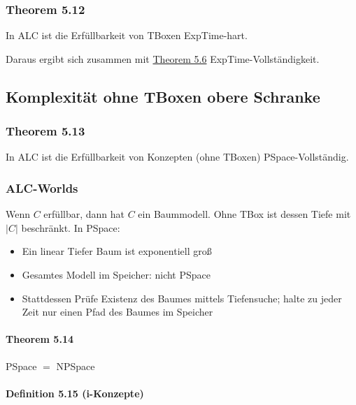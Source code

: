 \subsubsection{ Theorem 5.12}\label{theorem-5.12}

In ALC ist die Erfüllbarkeit von TBoxen ExpTime-hart.

Daraus ergibt sich zusammen mit \protect\hyperlink{theorem-5.6}{Theorem
5.6} ExpTime-Vollständigkeit.

\subsection{Komplexität ohne TBoxen obere
Schranke}\label{komplexituxe4t-ohne-tboxen-obere-schranke}

\subsubsection{Theorem 5.13}\label{theorem-5.13}

In ALC ist die Erfüllbarkeit von Konzepten (ohne TBoxen)
PSpace-Vollständig.

\subsubsection{ALC-Worlds}\label{alc-worlds}

Wenn $C$ erfüllbar, dann hat $C$ ein Baummodell. Ohne TBox ist
dessen Tiefe mit $\left| C \right|$ beschränkt. In PSpace:

\begin{itemize}
\item
  Ein linear Tiefer Baum ist exponentiell groß
\item
  Gesamtes Modell im Speicher: nicht PSpace
\item
  Stattdessen Prüfe Existenz des Baumes mittels Tiefensuche; halte zu
  jeder Zeit nur einen Pfad des Baumes im Speicher
\end{itemize}

\paragraph{Theorem 5.14}\label{theorem-5.14}

PSpace $=$ NPSpace

\paragraph{Definition 5.15
(i-Konzepte)}\label{definition-5.15-i-konzepte}

